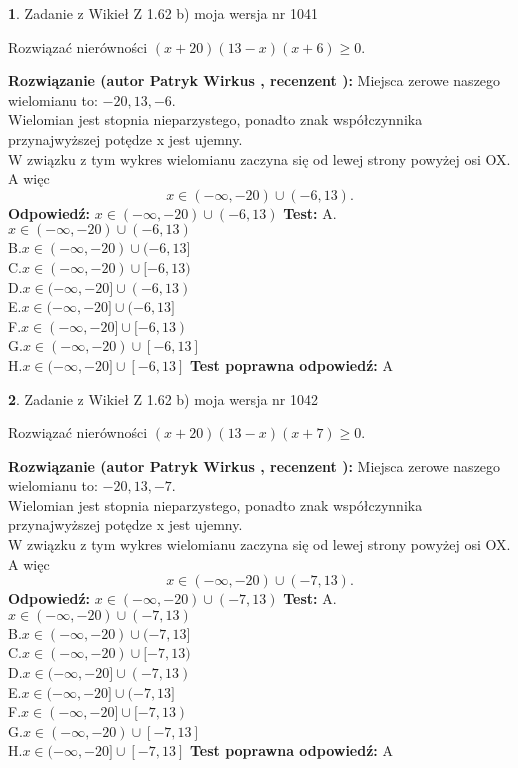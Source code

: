 \documentclass[12pt, a4paper]{article}
\theoremstyle{definition} %
\newtheorem{zad}{}
\newcommand{\zadStart}[1]{\begin{zad}#1\newline}
\newcommand{\zadStop}{\end{zad}}
\newcommand{\rozwStart}[2]{\noindent \textbf{Rozwiązanie (autor #1 , recenzent #2): }\newline}
\newcommand{\rozwStop}{\newline}
\newcommand{\odpStart}{\noindent \textbf{Odpowiedź:}\newline}
\newcommand{\odpStop}{\newline}
\newcommand{\testStart}{\noindent \textbf{Test:}\newline}
\newcommand{\testStop}{\newline}
\newcommand{\kluczStart}{\noindent \textbf{Test poprawna odpowiedź:}\newline}
\newcommand{\kluczStop}{\newline}
\begin{document}
\zadStart{Zadanie z Wikieł Z 1.62 b) moja wersja nr 1041}

Rozwiązać nierówności $(x+20)(13-x)(x+6)\ge0$.
\zadStop
\rozwStart{Patryk Wirkus}{}
Miejsca zerowe naszego wielomianu to: $-20, 13, -6$.\\
Wielomian jest stopnia nieparzystego, ponadto znak współczynnika przy\linebreak najwyższej potędze x jest ujemny.\\ W związku z tym wykres wielomianu zaczyna się od lewej strony powyżej osi OX. A więc $$x \in (-\infty,-20) \cup (-6,13).$$
\rozwStop
\odpStart
$x \in (-\infty,-20) \cup (-6,13)$
\odpStop
\testStart
A.$x \in (-\infty,-20) \cup (-6,13)$\\
B.$x \in (-\infty,-20) \cup (-6,13]$\\
C.$x \in (-\infty,-20) \cup [-6,13)$\\
D.$x \in (-\infty,-20] \cup (-6,13)$\\
E.$x \in (-\infty,-20] \cup (-6,13]$\\
F.$x \in (-\infty,-20] \cup [-6,13)$\\
G.$x \in (-\infty,-20) \cup [-6,13]$\\
H.$x \in (-\infty,-20] \cup [-6,13]$
\testStop
\kluczStart
A
\kluczStop



\zadStart{Zadanie z Wikieł Z 1.62 b) moja wersja nr 1042}

Rozwiązać nierówności $(x+20)(13-x)(x+7)\ge0$.
\zadStop
\rozwStart{Patryk Wirkus}{}
Miejsca zerowe naszego wielomianu to: $-20, 13, -7$.\\
Wielomian jest stopnia nieparzystego, ponadto znak współczynnika przy\linebreak najwyższej potędze x jest ujemny.\\ W związku z tym wykres wielomianu zaczyna się od lewej strony powyżej osi OX. A więc $$x \in (-\infty,-20) \cup (-7,13).$$
\rozwStop
\odpStart
$x \in (-\infty,-20) \cup (-7,13)$
\odpStop
\testStart
A.$x \in (-\infty,-20) \cup (-7,13)$\\
B.$x \in (-\infty,-20) \cup (-7,13]$\\
C.$x \in (-\infty,-20) \cup [-7,13)$\\
D.$x \in (-\infty,-20] \cup (-7,13)$\\
E.$x \in (-\infty,-20] \cup (-7,13]$\\
F.$x \in (-\infty,-20] \cup [-7,13)$\\
G.$x \in (-\infty,-20) \cup [-7,13]$\\
H.$x \in (-\infty,-20] \cup [-7,13]$
\testStop
\kluczStart
A
\kluczStop
\end{document}

